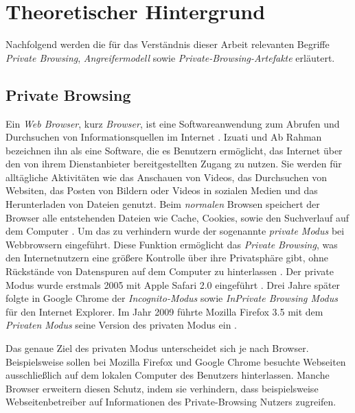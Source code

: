 \chapter{Theoretischer Hintergrund}\label{chap:theorie}

Nachfolgend werden die für das Verständnis dieser Arbeit relevanten Begriffe \textit{Private Browsing}, \textit{Angreifermodell} sowie \textit{Private-Browsing-Artefakte} erläutert.

\section{Private Browsing}\label{chap:theorie-private-browsing}

Ein \textit{Web Browser}, kurz \textit{Browser}, ist eine Softwareanwendung zum Abrufen und Durchsuchen von Informationsquellen im Internet \cite{Rochmadi.2017}. Izuati und Ab Rahman \cite{Izzati.2022} bezeichnen ihn als eine Software, die es Benutzern ermöglicht, das Internet über den von ihrem Dienstanbieter bereitgestellten Zugang zu nutzen. Sie werden für alltägliche Aktivitäten wie das Anschauen von Videos, das Durchsuchen von Websiten, das Posten von Bildern oder Videos in sozialen Medien und das Herunterladen von Dateien genutzt. \cite{Izzati.2022}
Beim \textit{normalen} Browsen speichert der Browser alle entstehenden Dateien wie Cache, Cookies, sowie den Suchverlauf auf dem Computer \cite{Izzati.2022}. Um das zu verhindern wurde der sogenannte \textit{private Modus} bei Webbrowsern eingeführt. Diese Funktion ermöglicht das \textit{Private Browsing}, was den Internetnutzern eine größere Kontrolle über ihre Privatsphäre gibt, ohne Rückstände von Datenspuren auf dem Computer zu hinterlassen \cite{Said.2011}. Der private Modus wurde erstmals 2005 mit Apple Safari 2.0 eingeführt \cite{Said.2011}. Drei Jahre später folgte in Google Chrome der \textit{Incognito-Modus} sowie \textit{InPrivate Browsing Modus} für den Internet Explorer. Im Jahr 2009 führte Mozilla Firefox 3.5 mit dem \textit{Privaten Modus} seine Version des privaten Modus ein \cite{Montasari.2015}.

Das genaue Ziel des privaten Modus unterscheidet sich je nach Browser. Beispielsweise sollen bei Mozilla Firefox und Google Chrome besuchte Webseiten ausschließlich auf dem lokalen Computer des Benutzers hinterlassen. \cite{MozillaWiki.05.06.2023,GoogleChrome.} Manche Browser erweitern diesen Schutz, indem sie verhindern, dass beispielsweise Webseitenbetreiber auf Informationen des Private-Browsing Nutzers zugreifen. \cite{Tor.24.05.2023}

